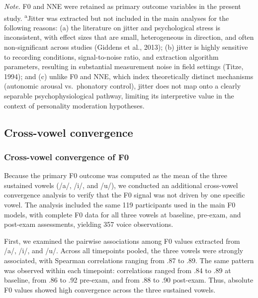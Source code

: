 \documentclass[
  english,
  man,floatsintext]{apa6}
\begin{document}
\begin{table}[p]
\begin{threeparttable}
\begin{tablenotes}
\footnotesize
\item \textit{Note.} F0 and NNE were retained as primary outcome variables in the present study. 
\textsuperscript{a}Jitter was extracted but not included in the main analyses for the following reasons: 
(a) the literature on jitter and psychological stress is inconsistent, with effect sizes that are small, heterogeneous in direction, and often non-significant across studies (Giddens et al., 2013); 
(b) jitter is highly sensitive to recording conditions, signal-to-noise ratio, and extraction algorithm parameters, resulting in substantial measurement noise in field settings (Titze, 1994); and 
(c) unlike F0 and NNE, which index theoretically distinct mechanisms (autonomic arousal vs.\ phonatory control), jitter does not map onto a clearly separable psychophysiological pathway, limiting its interpretive value in the context of personality moderation hypotheses.
\end{tablenotes}
\end{threeparttable}
\end{table}

\subsection{Cross-vowel convergence}\label{cross-vowel-convergence}

\subsubsection{Cross-vowel convergence of F0}\label{cross-vowel-convergence-of-f0}

Because the primary F0 outcome was computed as the mean of the three sustained vowels (/a/, /i/, and /u/), we conducted an additional cross-vowel convergence analysis to verify that the F0 signal was not driven by one specific vowel. The analysis included the same 119 participants used in the main F0 models, with complete F0 data for all three vowels at baseline, pre-exam, and post-exam assessments, yielding 357 voice observations.

First, we examined the pairwise associations among F0 values extracted from /a/, /i/, and /u/. Across all timepoints pooled, the three vowels were strongly associated, with Spearman correlations ranging from .87 to .89. The same pattern was observed within each timepoint: correlations ranged from .84 to .89 at baseline, from .86 to .92 pre-exam, and from .88 to .90 post-exam. Thus, absolute F0 values showed high convergence across the three sustained vowels.
\end{document}
